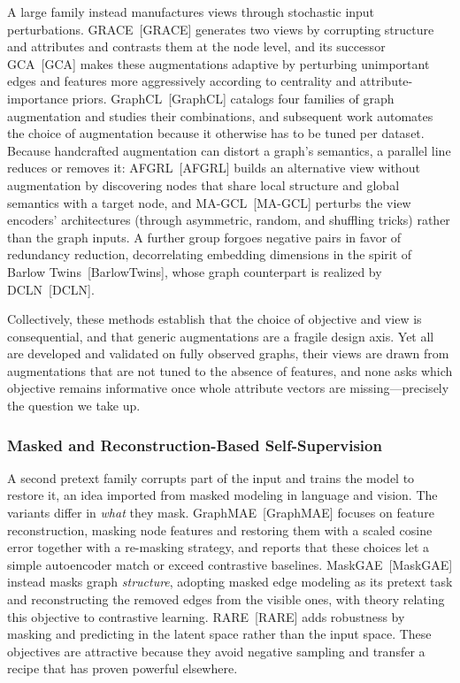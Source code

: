 A large family instead manufactures views through stochastic input perturbations. GRACE~[GRACE] generates two views by corrupting structure and attributes and contrasts them at the node level, and its successor GCA~[GCA] makes these augmentations adaptive by perturbing unimportant edges and features more aggressively according to centrality and attribute-importance priors. GraphCL~[GraphCL] catalogs four families of graph augmentation and studies their combinations, and subsequent work automates the choice of augmentation because it otherwise has to be tuned per dataset. Because handcrafted augmentation can distort a graph's semantics, a parallel line reduces or removes it: AFGRL~[AFGRL] builds an alternative view without augmentation by discovering nodes that share local structure and global semantics with a target node, and MA-GCL~[MA-GCL] perturbs the view encoders' architectures (through asymmetric, random, and shuffling tricks) rather than the graph inputs. A further group forgoes negative pairs in favor of redundancy reduction, decorrelating embedding dimensions in the spirit of Barlow Twins~[BarlowTwins], whose graph counterpart is realized by DCLN~[DCLN].

Collectively, these methods establish that the choice of objective and view is consequential, and that generic augmentations are a fragile design axis. Yet all are developed and validated on fully observed graphs, their views are drawn from augmentations that are not tuned to the absence of features, and none asks which objective remains informative once whole attribute vectors are missing---precisely the question we take up.

\subsubsection{Masked and Reconstruction-Based Self-Supervision}
\label{sec:related-masked}

A second pretext family corrupts part of the input and trains the model to restore it, an idea imported from masked modeling in language and vision. The variants differ in \emph{what} they mask. GraphMAE~[GraphMAE] focuses on feature reconstruction, masking node features and restoring them with a scaled cosine error together with a re-masking strategy, and reports that these choices let a simple autoencoder match or exceed contrastive baselines. MaskGAE~[MaskGAE] instead masks graph \emph{structure}, adopting masked edge modeling as its pretext task and reconstructing the removed edges from the visible ones, with theory relating this objective to contrastive learning. RARE~[RARE] adds robustness by masking and predicting in the latent space rather than the input space. These objectives are attractive because they avoid negative sampling and transfer a recipe that has proven powerful elsewhere.

